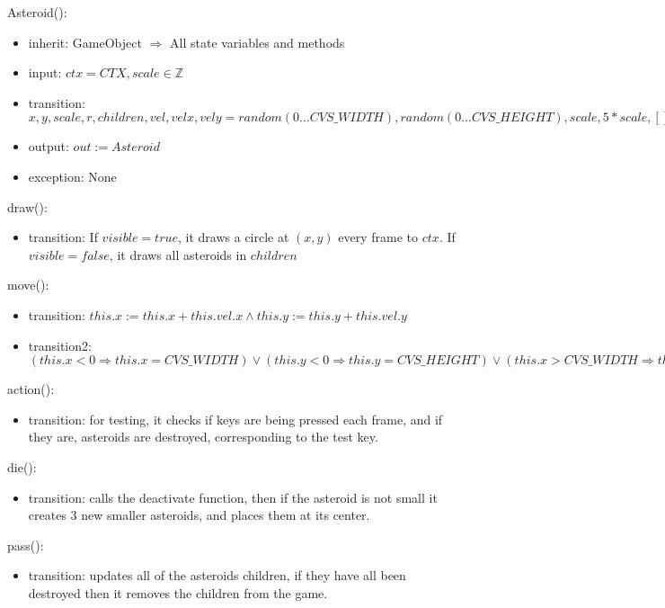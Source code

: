 \documentclass[12pt]{article}
\begin{document}
Asteroid():
\begin{itemize}
    \item inherit: GameObject $\Rightarrow$ All state variables and methods
    \item input: $ctx = CTX, scale \in \mathbb{Z}$
    \item transition: $ x, y, scale, r, children, vel, velx, vely = random(0...CVS\_WIDTH), random(0...CVS\_HEIGHT), scale, 5*scale, [],
    random(-1...1) * 3,
    random(-1...1) * 3$
    \item output: $out := Asteroid$
    \item exception: None
\end{itemize}

\noindent draw():
\begin{itemize}
  \item transition: If $visible = true$, it draws a circle at $(x,y)$ every frame to $ctx$. If $visible = false$, it draws all asteroids in $children$
\end{itemize}

\noindent move():
\begin{itemize}
  \item transition: $this.x := this.x + this.vel.x \land this.y := this.y + this.vel.y$
  \item transition2: $(this.x < 0 \Rightarrow this.x = CVS\_WIDTH) \lor (this.y < 0 \Rightarrow this.y = CVS\_HEIGHT) \lor (this.x > CVS\_WIDTH \Rightarrow this.x = 0) \lor (this.y > CVS\_HEIGHT \Rightarrow this.y = 0)$
\end{itemize}

\noindent action():
\begin{itemize}
    \item transition: for testing, it checks if keys are being pressed each frame, and if they are, asteroids are destroyed, corresponding to the test key.
\end{itemize}

\noindent die():
\begin{itemize}
    \item transition: calls the deactivate function, then if the asteroid is not small it creates 3 new smaller asteroids, and places them at its center.
\end{itemize}

\noindent pass():
\begin{itemize}
    \item transition: updates all of the asteroids children, if they have all been destroyed then it removes the children from the game.
\end{itemize}
\end{document}
